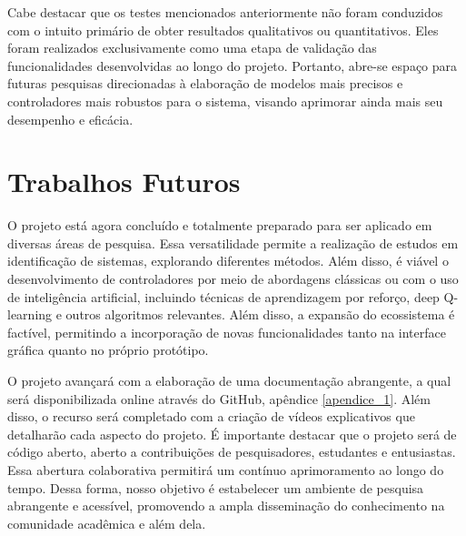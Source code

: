 Cabe destacar que os testes mencionados anteriormente não foram conduzidos com o intuito primário de obter resultados qualitativos ou quantitativos. Eles foram realizados exclusivamente como uma etapa de validação das funcionalidades desenvolvidas ao longo do projeto. Portanto, abre-se espaço para futuras pesquisas direcionadas à elaboração de modelos mais precisos e controladores mais robustos para o sistema, visando aprimorar ainda mais seu desempenho e eficácia.

\section{Trabalhos Futuros}
\label{trabalhos_futuros}

O projeto está agora concluído e totalmente preparado para ser aplicado em diversas áreas de pesquisa. Essa versatilidade permite a realização de estudos em identificação de sistemas, explorando diferentes métodos. Além disso, é viável o desenvolvimento de controladores por meio de abordagens clássicas ou com o uso de inteligência artificial, incluindo técnicas de aprendizagem por reforço, deep Q-learning e outros algoritmos relevantes. Além disso, a expansão do ecossistema é factível, permitindo a incorporação de novas funcionalidades tanto na interface gráfica quanto no próprio protótipo.

O projeto avançará com a elaboração de uma documentação abrangente, a qual será disponibilizada online através do GitHub, apêndice \ref{apendice_1}. Além disso, o recurso será completado com a criação de vídeos explicativos que detalharão cada aspecto do projeto. É importante destacar que o projeto será de código aberto, aberto a contribuições de pesquisadores, estudantes e entusiastas. Essa abertura colaborativa permitirá um contínuo aprimoramento ao longo do tempo. Dessa forma, nosso objetivo é estabelecer um ambiente de pesquisa abrangente e acessível, promovendo a ampla disseminação do conhecimento na comunidade acadêmica e além dela.
